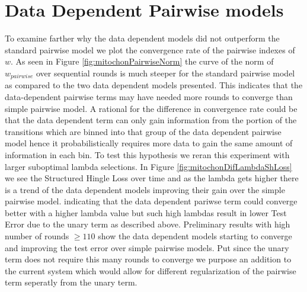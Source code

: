 \section{Data Dependent Pairwise models}
To examine farther why the data dependent models did not outperform the standard pairwise model we plot the convergence rate of the pairwise indexes of $w$. As seen in Figure \ref{fig:mitochonPairwiseNorm} the curve of the norm of $w_{pairwise}$ over sequential rounds is much steeper for the standard pairwise model as compared to the two data dependent models presented. This indicates that the data-dependent pairwise terms may have needed more rounds to converge than simple pairwise model. A rational for the difference in convergence rate could be that the data dependent term can only gain information from the portion of the transitions which are binned into that group of the data dependent pairwise model hence it probabilistically requires more data to gain the same amount of information in each bin. To test this hypothesis we reran this experiment with larger suboptimal lambda selections. In Figure \ref{fig:mitochonDifLambdaShLoss} we see the Structured Hingle Loss over time and as the lambda gets higher there is a trend of the data dependent models improving their gain over the simple pairwise model. indicating that the data dependent pariwse term could converge better with a higher lambda value but such high lambdas result in lower Test Error due to the unary term as described above. Preliminary results with high number of rounds $\geq 110$ show the data dependent models starting to converge and improving the test error over simple pairwise models. Put since the unary term does not require this many rounds to converge we purpose an addition to the current system which would allow for different regularization of the pairwise term seperatly from the unary term. 




